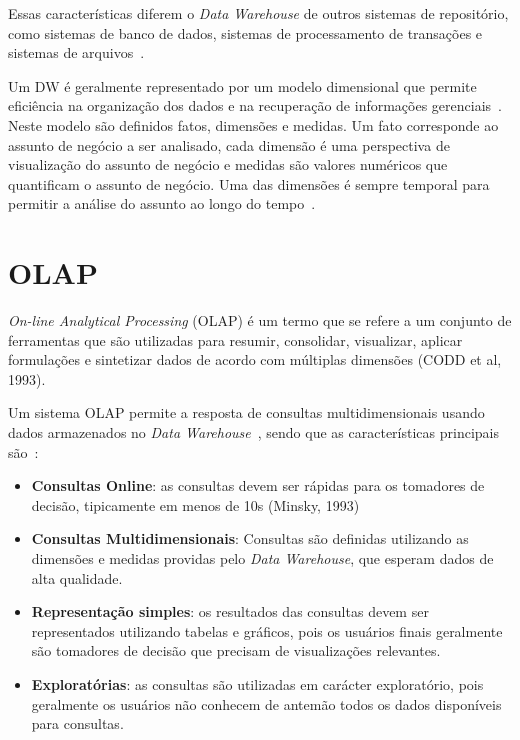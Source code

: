 Essas características diferem o \textit{Data Warehouse} de outros sistemas de repositório, como sistemas de banco de dados, sistemas de processamento de transações e sistemas de arquivos~\cite{silva:2015:abordagensParaCubo,bimonteOpenIssuesBig2016}.

Um DW é geralmente representado por um modelo dimensional que permite eficiência na organização dos dados e na recuperação de informações gerenciais~\cite{kimballDataWarehouseToolkit2013}.
Neste modelo são definidos fatos, dimensões e medidas.
Um fato corresponde ao assunto de negócio a ser analisado, cada dimensão é uma perspectiva de visualização do assunto de negócio e medidas são valores numéricos que quantificam o assunto de negócio.
Uma das dimensões é sempre temporal para permitir a análise do assunto ao longo do tempo~\cite{silva:2015:abordagensParaCubo}.

\section{OLAP}
\label{ch:fun:olap}

\textit{On-line Analytical Processing} (OLAP) é um termo que se refere a um conjunto de ferramentas que são utilizadas para resumir, consolidar, visualizar, aplicar formulações e sintetizar dados de acordo com múltiplas dimensões (CODD et al, 1993).

Um sistema OLAP permite a resposta de consultas multidimensionais usando dados armazenados no \textit{Data Warehouse}~\cite{kimballDataWarehouseToolkit2013}, sendo que as características principais são~\cite{bimonteOpenIssuesBig2016}:

\begin{itemize}
	\item \textbf{Consultas Online}: as consultas devem ser rápidas para os tomadores de decisão, tipicamente em menos de 10s{\color{red} (Minsky, 1993)}
	\item \textbf{Consultas Multidimensionais}: Consultas são definidas utilizando as dimensões e medidas providas pelo \textit{Data Warehouse}, que esperam dados de alta qualidade.
	\item \textbf{Representação simples}: os resultados das consultas devem ser representados utilizando tabelas e gráficos, pois os usuários finais geralmente são tomadores de decisão que precisam de visualizações relevantes.
	\item \textbf{Exploratórias}: as consultas são utilizadas em carácter exploratório, pois geralmente os usuários não conhecem de antemão todos os dados disponíveis para consultas.
\end{itemize}


